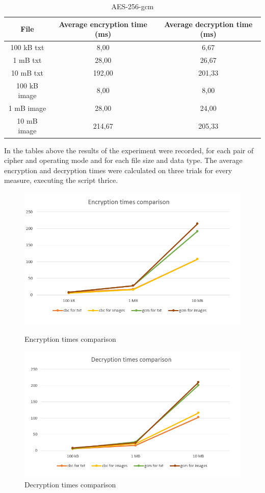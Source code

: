 \documentclass{article}
\begin{document}
\begin{table}[!h]
	\centering
	\caption{AES-256-gcm}
	\begin{tabular}[t]{|| c c c ||}
		\hline
		File & Average encryption time (ms) & Average decryption time (ms) \\  [0.5ex]
		\hline\hline
		100 kB txt & 8,00 & 6,67 \\
		\hline
		1 mB txt & 28,00 & 26,67 \\
		\hline
		10 mB txt & 192,00 & 201,33 \\
		\hline
		100 kB image & 8,00 & 8,00 \\
		\hline
		1 mB image & 28,00 & 24,00 \\
		\hline
		10 mB image & 214,67 & 205,33 \\
		\hline
	\end{tabular}
\end{table}

In the tables above the results of the experiment were recorded, for each pair of cipher and operating mode and for each file size and data type. The average encryption and decryption times were calculated on three trials for every measure, executing the script thrice.

\begin{figure}[!h]
	\centering
	\includegraphics[width=1\textwidth]{"img3-hw3-1743261.PNG"}
	\caption{Encryption times comparison}
	\centering
	\includegraphics[width=1\textwidth]{"img4-hw3-1743261.PNG"}
	\caption{Decryption times comparison}
\end{figure}
\clearpage
\end{document}
